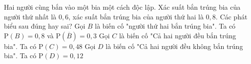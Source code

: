 \begin{ex}%
Hai người cùng bắn vào một bia một cách độc lập. Xác suất bắn trúng bia của người thứ nhất là $0{,}6$, xác suất bắn trúng bia của người thứ hai là $0{,}8$. Các phát biểu sau đúng hay sai?
{Gọi $B$ là biến cố "người thứ hai bắn trúng bia". Ta có $\mathrm{P}(B)=0{,}8$ và $\mathrm{P}(\overline{B})=0{,}3$}
{\True Gọi $C$ là biến cố "Cả hai người đều bắn trúng bia". Ta có $\mathrm{P}(C)=0{,}48$}
{Gọi $D$ là biến cố "Cả hai người đều không bắn trúng bia". Ta có $\mathrm{P}(D)=0{,}12$}
\end{ex}

